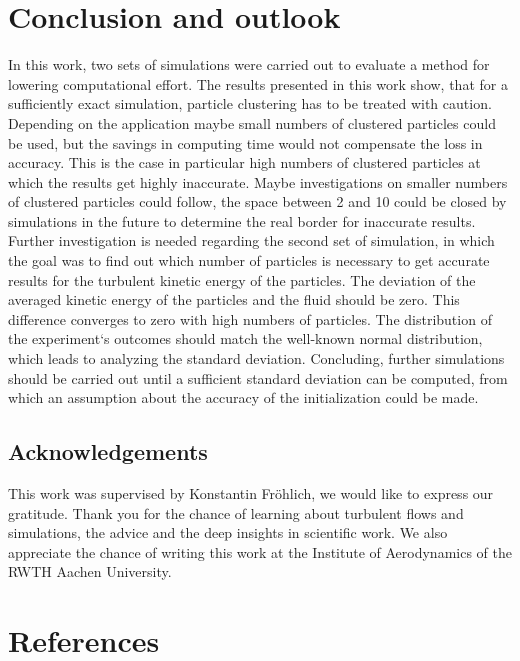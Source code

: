 \documentclass[11pt,a4paper,openany,oneside,parskip=half*]{article}
\begin{document}
\section{Conclusion and outlook}
In this work, two sets of simulations were carried out to evaluate a method for lowering computational effort. 
\newline
The results presented in this work show, that for a sufficiently exact simulation, particle clustering has to be treated with caution. Depending on the application maybe small numbers of clustered particles could be used, but the savings in computing time would not compensate the loss in accuracy. This is the case in particular high numbers of clustered particles at which the results get highly inaccurate. Maybe investigations on smaller numbers of clustered particles could follow, the space between 2 and 10 could be closed by simulations in the future to determine the real border for inaccurate results. 
\newline
Further investigation is needed regarding the second set of simulation, in which the goal was to find out which number of particles is necessary to get accurate results for the turbulent kinetic energy of the particles. The deviation of the averaged kinetic energy of the particles and the fluid should be zero. This difference converges to zero with high numbers of particles. The distribution of the experiment`s outcomes should match the well-known normal distribution, which leads to analyzing the standard deviation. Concluding, further simulations should be carried out until a sufficient standard deviation can be computed, from which an assumption about the accuracy of the initialization could be made.
\newline
\subsection*{Acknowledgements}
This work was supervised by Konstantin Fr\"ohlich, we would like to express our gratitude. Thank you for the chance of learning about turbulent flows and simulations, the advice and the deep insights in scientific work. We also appreciate the chance of writing this work at the Institute of Aerodynamics of the RWTH Aachen University.
\pagebreak
\section{References}
\nocite{*} %
\pagebreak
\end{document}
